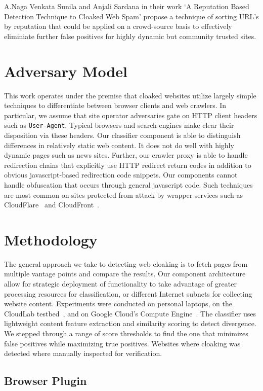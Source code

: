 \documentclass[letterpaper,twocolumn,10pt]{article}
\begin{document}
A.Naga Venkata Sunila and Anjali Sardana in their work `A Reputation Based Detection Technique to Cloaked Web Spam'\cite{sunil2012reputation} propose a technique of sorting URL's by reputation that could be applied on a crowd-source basis to effectively eliminiate further false positives for highly dynamic but community trusted sites.
\section{Adversary Model}

This work operates under the premise that cloaked websites utilize largely simple techniques to differentiate between browser clients and web crawlers. In particular, we assume that site operator adversaries gate on HTTP client headers such as \texttt{User-Agent}.  Typical browsers and search engines make clear their disposition via these headers.  Our classifier component is able to distinguish differences in relatively static web content.  It does not do well with highly dynamic pages such as news sites.  Further, our crawler proxy is able to handle redirection chains that explicitly use HTTP redirect return codes in addition to obvious javascript-based redirection code snippets.  Our components cannot handle obfuscation that occurs through general javascript code.  Such techniques are most common on sites protected from attack by wrapper services such as CloudFlare~\cite{cloudflare} and CloudFront~\cite{cloudfront}.

\section{Methodology}

The general approach we take to detecting web cloaking is to fetch pages from multiple vantage points and compare the results.  Our component architecture allow for strategic deployment of functionality to take advantage of greater processing resources for classification, or different Internet subnets for collecting website content. Experiments were conducted on personal laptops, on the CloudLab testbed~\cite{cloudlab}, and on Google Cloud's Compute Engine~\cite{gcloud}. The classifier uses lightweight content feature extraction and similarity scoring to detect divergence.  We stepped through a range of score thresholds to find the one that minimizes false positives while maximizing true positives.  Websites where cloaking was detected where manually inspected for verification.

\subsection{Browser Plugin}
\end{document}
